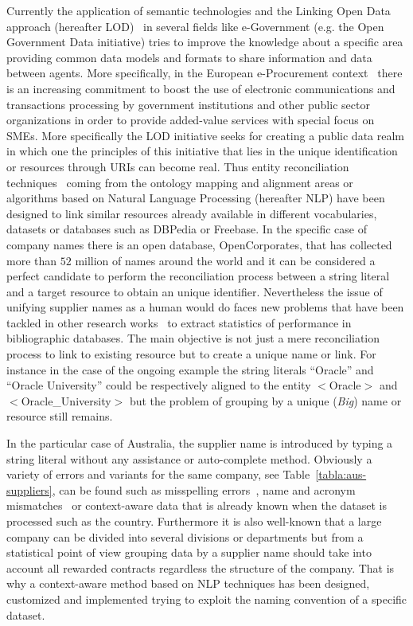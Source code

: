 \documentclass{llncs}
\begin{document}
Currently the application of semantic technologies and the Linking Open Data approach (hereafter LOD)~\cite{Berners-Lee-2006,Heath_Bizer_2011}  
in several fields like e-Government (e.g. the Open Government Data initiative) tries to improve the knowledge about a specific area providing 
common data models and formats to share information and data between agents. More specifically, in the European e-Procurement 
context~\cite{e-Proc-map-paper} there is an increasing commitment to boost the use of electronic communications and transactions 
processing by government institutions and other public sector organizations in order to provide added-value services with special focus on SMEs. 
More specifically the LOD initiative seeks for creating a public data realm in which one the principles of this initiative that lies in the 
unique identification or resources through URIs can become real. Thus entity reconciliation techniques~\cite{Serimi,conf/www/MaaliCP11} 
coming from the ontology mapping and alignment areas or algorithms based on Natural Language Processing (hereafter NLP) have been 
designed to link similar resources already available in different vocabularies, datasets or databases such as DBPedia or Freebase. 
In the specific case of company names there is an open database, OpenCorporates, that has collected more than $52$ million of names 
around the world and it can be considered a perfect candidate to perform the reconciliation process between a string literal and a 
target resource to obtain an unique identifier. Nevertheless the issue of unifying supplier names as a human would do 
faces new  problems that have been tackled in other research works~\cite{Galvez2006} to extract statistics of performance in bibliographic databases. 
The main objective is not just a mere reconciliation process to link to existing resource but to create a unique name or link. For instance in the case 
of the ongoing example the string literals ``Oracle'' and ``Oracle University'' could be respectively aligned 
to the entity $<$Oracle$>$ and $<$Oracle\_University$>$ but the problem of grouping by a unique (\textit{Big}) name 
or resource still remains. 


In the particular case of Australia, the supplier name is introduced by typing a string literal without any assistance or 
auto-complete method. Obviously a variety of errors and variants for the same company, see Table~\ref{tabla:aus-suppliers}, 
can be found such as misspelling errors~\cite{NorvigSpelling,StanfordSpelling}, name and 
acronym mismatches~\cite{Yeates99automaticextraction,Ratinov:2004:AES:1025132.1026366} or context-aware data that is 
already known when the dataset is processed such as the country. Furthermore it is also well-known that a large company can 
be divided into several divisions or departments but from a statistical point of view grouping data by a supplier name 
should take into account all rewarded contracts regardless the structure of the company. That is why a context-aware 
method based on NLP techniques has been designed, customized and implemented trying to exploit the naming convention of 
a specific dataset.
\end{document}
